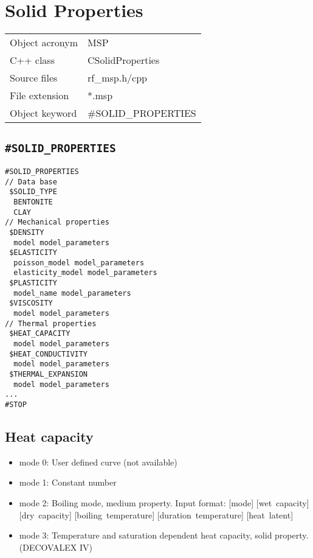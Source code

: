 \section{Solid Properties}

\begin{tabular*}{8.35cm}{|p{2.5cm}|p{5cm}|} \hline
Object acronym & MSP \\
C++ class      & CSolidProperties \\
Source files   & rf\_msp.h/cpp \\
\hline
File extension & *.msp \\
Object keyword & \#SOLID\_PROPERTIES \\
\hline
\end{tabular*}


\subsection{\texttt{\bf\#SOLID\_PROPERTIES}}


\begin{verbatim}
#SOLID_PROPERTIES
// Data base
 $SOLID_TYPE
  BENTONITE
  CLAY
// Mechanical properties
 $DENSITY
  model model_parameters
 $ELASTICITY
  poisson_model model_parameters
  elasticity_model model_parameters
 $PLASTICITY
  model_name model_parameters
 $VISCOSITY
  model model_parameters
// Thermal properties
 $HEAT_CAPACITY
  model model_parameters
 $HEAT_CONDUCTIVITY
  model model_parameters
 $THERMAL_EXPANSION
  model model_parameters
...
#STOP
\end{verbatim}

\subsection{Heat capacity}
\begin{itemize}
  \item mode 0: User defined curve (not available)
  \item mode 1: Constant number
  \item mode 2: Boiling mode, medium property. Input format: [mode] [\mbox{wet capacity}]
                     [\mbox{dry capacity}]   [\mbox{boiling temperature}]
                     [\mbox{duration temperature}]  [\mbox{heat latent}]
 \item mode 3: Temperature and saturation dependent heat capacity, solid property.  (DECOVALEX IV)
\end{itemize}

